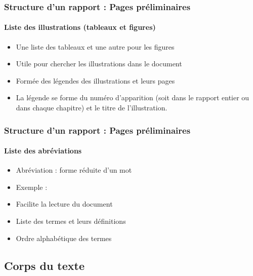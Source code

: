 \documentclass[xcolor=table]{beamer}
\begin{document}
\begin{frame}
\frametitle{Structure d'un rapport : Pages préliminaires}
\framesubtitle{Liste des illustrations (tableaux et figures)}

\begin{minipage}{0.60\textwidth}
	\begin{itemize}
		\item Une liste des tableaux et une autre pour les figures
		\item Utile pour chercher les illustrations dans le document
		\item Formée des légendes des illustrations et leurs pages
		\item La légende se forme du numéro d'apparition (soit dans le rapport entier ou dans chaque chapitre) et le titre de l'illustration.
	\end{itemize}
\end{minipage}
\begin{minipage}{0.38\textwidth}
\end{minipage}

\end{frame}

\begin{frame}
\frametitle{Structure d'un rapport : Pages préliminaires}
\framesubtitle{Liste des abréviations}

\begin{minipage}{0.60\textwidth}
	\begin{itemize}
		\item Abréviation : forme réduite d'un mot
		\item Exemple : 
		\item Facilite la lecture du document 
		\item Liste des termes et leurs définitions
		\item Ordre alphabétique des termes
	\end{itemize}
\end{minipage}
\begin{minipage}{0.38\textwidth}
\end{minipage}

\end{frame}

\subsection{Corps du texte}
\end{document}
